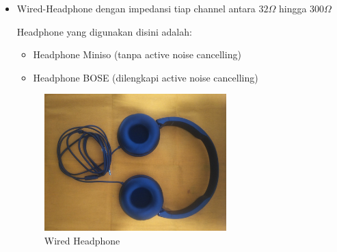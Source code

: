 \documentclass[12pt,]{article}
\begin{document}
\begin{itemize}
		
		\item Wired-Headphone dengan impedansi tiap channel antara $32\Omega$ hingga $300\Omega$

		Headphone yang digunakan disini adalah: 
		\begin{itemize}
			\item Headphone Miniso (tanpa active noise cancelling)
			\item Headphone BOSE (dilengkapi active noise cancelling)
		\end{itemize}
		\begin{figure}[!ht]
			\centering
			\includegraphics[width=200pt]{images/foto/phone}
			\caption{Wired Headphone}
		\end{figure}
	

\end{itemize}
\end{document}
